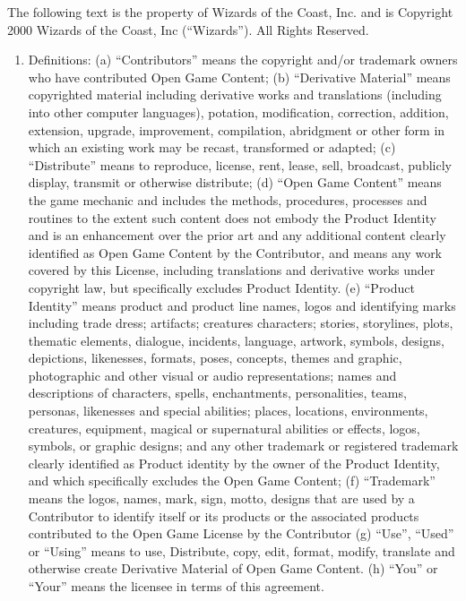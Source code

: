 \documentclass{tufte-handout}
\begin{document}
\begin{fullwidth}
The following text is the property of Wizards of the Coast, Inc. and
is Copyright 2000 Wizards of the Coast, Inc (``Wizards''). All Rights
Reserved.

\begin{enumerate}

\item Definitions: (a) ``Contributors'' means the copyright and/or
  trademark owners who have contributed Open Game Content; (b)
  ``Derivative Material'' means copyrighted material including
  derivative works and translations (including into other computer
  languages), potation, modification, correction, addition, extension,
  upgrade, improvement, compilation, abridgment or other form in which
  an existing work may be recast, transformed or adapted; (c)
  ``Distribute'' means to reproduce, license, rent, lease, sell,
  broadcast, publicly display, transmit or otherwise distribute; (d)
  ``Open Game Content'' means the game mechanic and includes the
  methods, procedures, processes and routines to the extent such
  content does not embody the Product Identity and is an enhancement
  over the prior art and any additional content clearly identified as
  Open Game Content by the Contributor, and means any work covered by
  this License, including translations and derivative works under
  copyright law, but specifically excludes Product Identity. (e)
  ``Product Identity'' means product and product line names, logos and
  identifying marks including trade dress; artifacts; creatures
  characters; stories, storylines, plots, thematic elements, dialogue,
  incidents, language, artwork, symbols, designs, depictions,
  likenesses, formats, poses, concepts, themes and graphic,
  photographic and other visual or audio representations; names and
  descriptions of characters, spells, enchantments, personalities,
  teams, personas, likenesses and special abilities; places,
  locations, environments, creatures, equipment, magical or
  supernatural abilities or effects, logos, symbols, or graphic
  designs; and any other trademark or registered trademark clearly
  identified as Product identity by the owner of the Product Identity,
  and which specifically excludes the Open Game Content; (f)
  ``Trademark'' means the logos, names, mark, sign, motto, designs
  that are used by a Contributor to identify itself or its products or
  the associated products contributed to the Open Game License by the
  Contributor (g) ``Use'', ``Used'' or ``Using'' means to use,
  Distribute, copy, edit, format, modify, translate and otherwise
  create Derivative Material of Open Game Content. (h) ``You'' or
  ``Your'' means the licensee in terms of this agreement.


\end{enumerate}
\end{fullwidth}
\end{document}
